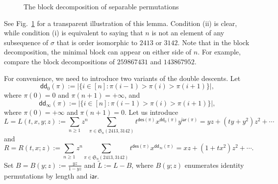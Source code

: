 \documentclass[12pt]{amsart}
\numberwithin{equation}{section}
\theoremstyle{plain}
\theoremstyle{definition}
\def\des{\mathsf{des}}
\def\S{\mathfrak{S}}
\def\iar{\mathsf{iar}}
\def\dd{\mathsf{dd}}
\begin{document}
\begin{figure}
\caption{The block decomposition of separable permutations}
\label{block:sta}
\end{figure}

See Fig.~\ref{block:sta} for a transparent illustration of this lemma. Condition (ii) is clear, while condition (i) is equivalent to saying that $n$ is not an element of any subsequence of $\sigma$ that is order isomorphic to $2413$ or $3142$. Note that in the block decomposition, the minimal block can appear on either side of $n$. For example, compare the block decompositions of $259867431$ and $143867952$.

For convenience, we need to introduce  two variants of the double descents. Let 
$$
\dd_0(\pi):=|\{i\in[n]: \pi(i-1)>\pi(i)>\pi(i+1)\}|,
$$
where $\pi(0)=0$ and $\pi(n+1)=+\infty$, and 
$$
\dd_{\infty}(\pi):=|\{i\in[n]: \pi(i-1)>\pi(i)>\pi(i+1)\}|,
$$
where $\pi(0)=+\infty$ and $\pi(n+1)=0$. Let us introduce 
$$
L=L(t,x,y;z):=\sum_{n\geq1}z^n\sum_{\pi\in\S_n(2413,3142)}t^{\des(\pi)}x^{\dd_0(\pi)}y^{\iar(\pi)}=yz+(ty+y^2)z^2+\cdots
$$
and 
$$
R=R(t,x;z):=\sum_{n\geq1}z^n\sum_{\pi\in\S_n(2413,3142)}t^{\des(\pi)}x^{\dd_{\infty}(\pi)}=xz+(1+tx^2)z^2+\cdots.
$$
Set $B=B(y;z):=\frac{yz}{1-yz}$ and $\tilde L:=L-B$, where $B(y;z)$ enumerates identity permutations by length and $\iar$. 
\end{document}
